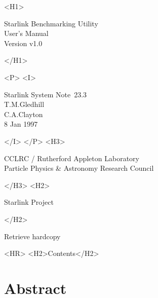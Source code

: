 \documentclass[11pt]{article}
\newcommand{\stardoccategory}  {Starlink System Note}
\newcommand{\stardocsource}    {ssn\stardocnumber}
\newcommand{\stardocnumber}    {23.3}
\newcommand{\stardocauthors}   {T.M.Gledhill \\
                                C.A.Clayton}
\newcommand{\stardocdate}      {8 Jan 1997}
\newcommand{\stardoctitle}     {Starlink Benchmarking Utility}
\newcommand{\stardocversion}   {Version \pkgver}
\newcommand{\stardocmanual}    {User's Manual}
\newcommand{\htmladdnormallink}[2]{#1}
\newcommand{\htmladdimg}[1]{}
\newcommand{\htmlref}[2]{#1}
\newcommand{\htmladdtonavigation}[1]{}
\newcommand{\xlabel}[1]{}
\newcommand{\pkgver}     {v1.0}
\begin{document}
\begin{htmlonly}
   \xlabel{}
   \begin{rawhtml} <H1> \end{rawhtml}
      \stardoctitle\\
      \stardocmanual\\
      \stardocversion
   \begin{rawhtml} </H1> \end{rawhtml}


   \begin{rawhtml} <P> <I> \end{rawhtml}
   \stardoccategory\ \stardocnumber \\
   \stardocauthors \\
   \stardocdate
   \begin{rawhtml} </I> </P> <H3> \end{rawhtml}
      \htmladdnormallink{CCLRC}{http://www.cclrc.ac.uk} /
      \htmladdnormallink{Rutherford Appleton Laboratory}
                        {http://www.cclrc.ac.uk/ral} \\
      \htmladdnormallink{Particle Physics \& Astronomy Research Council}
                        {http://www.pparc.ac.uk} \\
   \begin{rawhtml} </H3> <H2> \end{rawhtml}
      \htmladdnormallink{Starlink Project}{http://www.starlink.ac.uk/}
   \begin{rawhtml} </H2> \end{rawhtml}
   \htmladdnormallink{\htmladdimg{source.gif} Retrieve hardcopy}
      {http://www.starlink.ac.uk/cgi-bin/hcserver?\stardocsource}\\

  \label{stardoccontents}
  \begin{rawhtml}
    <HR>
    <H2>Contents</H2>
  \end{rawhtml}
  \htmladdtonavigation{\htmlref{\htmladdimg{contents_motif.gif}}
        {stardoccontents}}

  \section{\xlabel{abstract}Abstract}

\end{htmlonly}
\end{document}
